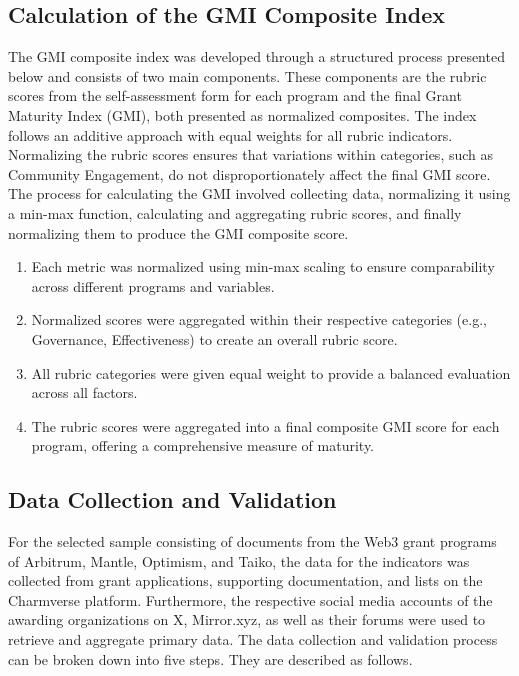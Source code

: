 \documentclass[a4,10pt]{article}
\begin{document}
\subsection{Calculation of the GMI Composite Index}\label{sec_5.6}
The GMI composite index was developed through a structured process presented below and consists of two main components. These components are the rubric scores from the self-assessment form for each program and the final Grant Maturity Index (GMI), both presented as normalized composites. The index follows an additive approach with equal weights for all rubric indicators. Normalizing the rubric scores ensures that variations within categories, such as Community Engagement, do not disproportionately affect the final GMI score. The process for calculating the GMI involved collecting data, normalizing it using a min-max function, calculating and aggregating rubric scores, and finally normalizing them to produce the GMI composite score.

\begin{enumerate}
    \item Each metric was normalized using min-max scaling to ensure comparability across different programs and variables.
    \item Normalized scores were aggregated within their respective categories (e.g., Governance, Effectiveness) to create an overall rubric score.
    \item All rubric categories were given equal weight to provide a balanced evaluation across all factors.
    \item The rubric scores were aggregated into a final composite GMI score for each program, offering a comprehensive measure of maturity.
\end{enumerate}

\subsection{Data Collection and Validation}\label{sec_5.7}
For the selected sample consisting of documents from the Web3 grant programs of Arbitrum, Mantle, Optimism, and Taiko, the data for the indicators was collected from grant applications, supporting documentation, and lists on the Charmverse platform. Furthermore, the respective social media accounts of the awarding organizations on X, Mirror.xyz, as well as their forums were used to retrieve and aggregate primary data. The data collection and validation process can be broken down into five steps. They are described as follows.
\end{document}
